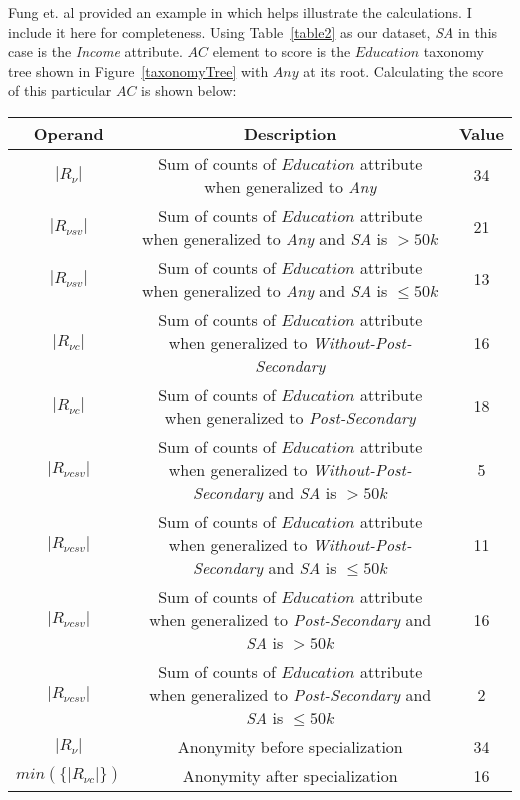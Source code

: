 \documentclass[11pt]{article}       %
\begin{document}
Fung et. al provided an example in \cite{Fung:2005} which helps illustrate the calculations. I include it here for completeness. Using Table~\ref{table2} as our dataset, \emph{SA} in this case is the \emph{Income} attribute. $AC$ element to score is the $Education$ taxonomy tree shown in Figure~\ref{taxonomyTree} with $Any$ at its root. Calculating the score of this particular $AC$ is shown below:

\begin{table}[htp]
\begin{adjustbox}{width=\textwidth, center}
\begin{tabular}{|c|c|c|}
\hline
Operand & Description & Value\\
\hline
$| R_\nu |$ & Sum of counts of $Education$ attribute when generalized to \emph{Any} & 34\\
$| R_{\nu sv} |$ & Sum of counts of $Education$ attribute when generalized to \emph{Any} and \emph{SA} is \(>50k\) & 21\\
$| R_{\nu sv} |$ & Sum of counts of $Education$ attribute when generalized to \emph{Any} and \emph{SA} is \(\leq50k\) & 13\\
$| R_{\nu c} |$ & Sum of counts of $Education$ attribute when generalized to \emph{Without-Post-Secondary} & 16\\
$| R_{\nu c} |$ & Sum of counts of $Education$ attribute when generalized to \emph{Post-Secondary} & 18\\
$| R_{\nu csv} |$ & Sum of counts of $Education$ attribute when generalized to \emph{Without-Post-Secondary} and \emph{SA} is \(>50k\) & 5\\
$| R_{\nu csv} |$ & Sum of counts of $Education$ attribute when generalized to \emph{Without-Post-Secondary} and \emph{SA} is \(\leq50k\) & 11\\
$| R_{\nu csv} |$ & Sum of counts of $Education$ attribute when generalized to \emph{Post-Secondary} and \emph{SA} is \(>50k\) & 16\\
$| R_{\nu csv} |$ & Sum of counts of $Education$ attribute when generalized to \emph{Post-Secondary} and \emph{SA} is \(\leq50k\) & 2\\
$| R_\nu |$ & Anonymity before specialization & 34\\
$min(\{| R_{\nu c} |\})$ & Anonymity after specialization & 16\\
\hline
\end{tabular}
\end{adjustbox}
\end{table}
\end{document}
